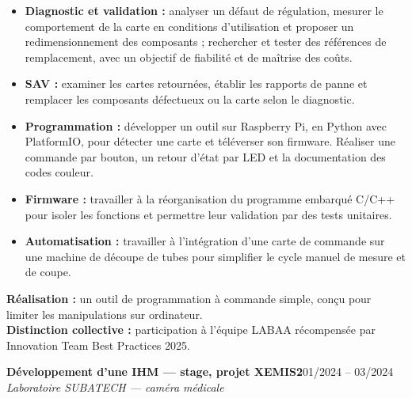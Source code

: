 \documentclass[10pt,a4paper]{article}
\newcommand{\poste}[3]{%
    \textbf{#1}\hfill #2\\
    \textit{#3}\par
}
\begin{document}
\begin{itemize}

    \item \textbf{Diagnostic et validation :}
    analyser un défaut de régulation, mesurer le comportement
    de la carte en conditions d'utilisation et proposer un
    redimensionnement des composants ; rechercher et tester
    des références de remplacement, avec un objectif de
    fiabilité et de maîtrise des coûts.

    \vspace{0.2cm}

    \item \textbf{SAV :}
    examiner les cartes retournées, établir les rapports de
    panne et remplacer les composants défectueux ou la carte
    selon le diagnostic.

    \vspace{0.2cm}

    \item \textbf{Programmation :}
    développer un outil sur Raspberry Pi, en Python avec
    PlatformIO, pour détecter une carte et téléverser son
    firmware. Réaliser une commande par bouton, un retour
    d'état par LED et la documentation des codes couleur.

    \vspace{0.2cm}

    \item \textbf{Firmware :}
    travailler à la réorganisation du programme embarqué C/C++
    pour isoler les fonctions et permettre leur validation
    par des tests unitaires.

    \vspace{0.2cm}

    \item \textbf{Automatisation :}
    travailler à l'intégration d'une carte de commande sur
    une machine de découpe de tubes pour simplifier le cycle
    manuel de mesure et de coupe.

\end{itemize}

\textbf{Réalisation :}
un outil de programmation à commande simple, conçu pour limiter
les manipulations sur ordinateur.\\

\textbf{Distinction collective :}
participation à l'équipe LABAA récompensée par
Innovation Team Best Practices 2025.

\vspace{0.5cm}
\poste
{Développement d'une IHM --- stage, projet XEMIS2}
{01/2024 -- 03/2024}
{Laboratoire SUBATECH --- caméra médicale}
\end{document}

